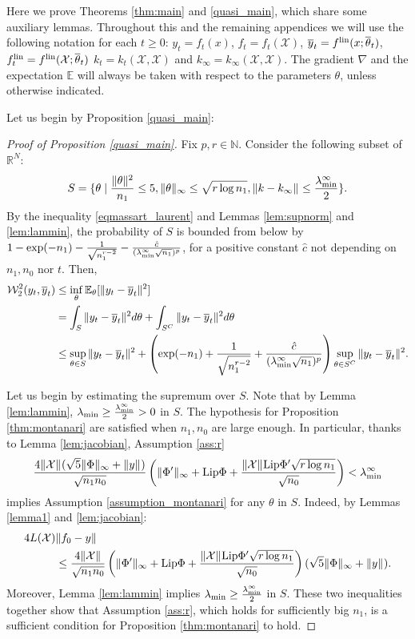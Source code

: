 \documentclass{article}
\theoremstyle{definition}
\theoremstyle{remark}
\numberwithin{equation}{section}
\newcommand{\X}{\mathcal{X}}
\newcommand{\R}{\mathbb{R}}
\newcommand{\N}{\mathbb{N}}
\newcommand{\E}{\mathbb{E}}
\newcommand{\lin}{{\textup{lin}}}
\newcommand{\lammin}{\lambda_{\textup{min}}}
\newcommand{\norm}[2]{
    \|#1\|_{#2}
}
\begin{document}
Here we prove Theorems \ref{thm:main} and \ref{quasi_main}, which share some auxiliary lemmas.
Throughout this and the remaining appendices we will use the following notation for each $t\ge 0$: $y_t=f_t(x)$, $f_t=f_t(\X)$, $\overline y_t=f^\lin(x;\overline \theta_t)$, $f^\lin_t=f^\lin(\X;\overline \theta_t)$
$k_t = k_t(\X,\X)$ and $k_\infty = k_\infty(\X,\X)$.
The gradient $\nabla$ and the expectation $\E$ will always be taken with respect to the parameters $\theta$, unless otherwise indicated.

Let us begin by Proposition \ref{quasi_main}:

\begin{proof}[Proof of Proposition \ref{quasi_main}]
    Fix $p, r \in \N$.
    Consider the following subset of $\R^N$:
    \[S = \{\theta \mid \frac{\norm{\theta}{}^2}{n_1} \le 5, \norm{\theta}{\infty} \le \sqrt{r\log n_1}, \norm{k-k_\infty}{}\le \frac{\lammin^\infty}{2}\}.\]
    By the inequality \eqref{eqmassart_laurent} and Lemmas \ref{lem:supnorm} and \ref{lem:lammin}, the probability of $S$ is bounded from below by 
    $1-\exp(-n_1)-\frac{1}{\sqrt{n_1^{r-2}}}-\frac{\hat c}{(\lammin^\infty \sqrt{n_1})^p}$, for a positive constant $\hat c$ not depending on $n_1, n_0$ nor $t$.
    Then,
    \begin{align}
        \mathcal W_2^2(y_t,\overline y_t) &\le \inf_{\theta} \E_\theta[\norm{y_t-\overline y_t}{}^2] \\
        \label{eqaux_wassfflin}& = \int_S \norm{y_t-\overline y_t}{}^2 d\theta + \int_{S^C}\norm{y_t-\overline y_t}{}^2 d\theta \\
        &\le \sup_{\theta \in S} \norm{y_t-\overline y_t}{}^2 + \left(\exp(-n_1)+\frac{1}{\sqrt{n_1^{r-2}}}+\frac{\hat c}{(\lammin^\infty \sqrt{n_1})^p}\right)\sup_{\theta \in S^C}\norm{y_t-\overline y_t}{}^2.
    \end{align}
    
    Let us begin by estimating the supremum over $S$.
    Note that by Lemma \ref{lem:lammin}, $\lammin\ge \frac{\lammin^\infty}{2} > 0$ in $S$.
    The hypothesis for Proposition \ref{thm:montanari} are satisfied when $n_1,n_0$ are large enough.
    In particular, thanks to Lemma \ref{lem:jacobian}, Assumption \ref{ass:r}
    \[
        \frac{4\norm{\X}{}(\sqrt 5\norm{\Phi}{\infty}+\norm{y}{})}{\sqrt{n_1n_0}}
        \left(\norm{\Phi'}{\infty} + \textup{Lip}\Phi + \frac{\norm{\X}{}\textup{Lip}\Phi'\sqrt{r \log n_1}}{\sqrt{n_0}}\right) < \lammin^\infty
    \]
    implies Assumption \ref{assumption_montanari} for any $\theta$ in $S$.
    Indeed, by Lemmas \ref{lemma1} and \ref{lem:jacobian}:
    \begin{align}
        4 L(\X) &\norm{f_0-y}{} \\
        &\le \frac{4\norm{\X}{}}{\sqrt{n_1n_0}}
        \left(\norm{\Phi'}{\infty} + \textup{Lip}\Phi + \frac{\norm{\X}{}\textup{Lip}\Phi'\sqrt{r \log n_1}}{\sqrt{n_0}}\right)(\sqrt 5\norm{\Phi}{\infty}+\norm{y}{}).
    \end{align}
    Moreover, Lemma \ref{lem:lammin} implies $\lammin \ge \frac{\lammin^\infty}{2}$ in $S$.
    These two inequalities together show that Assumption \ref{ass:r}, which holds for sufficiently big $n_1$, is a sufficient condition for Proposition \ref{thm:montanari} to hold.


\end{proof}
\end{document}
